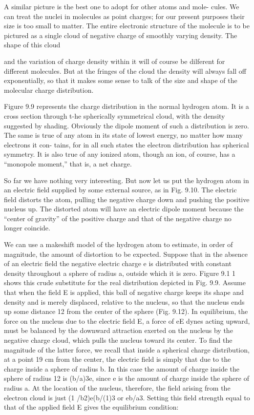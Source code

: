 A similar picture is the best one to adopt for other atoms and mole-
cules. We can treat the nuclei in molecules as point charges; for our
present purposes their size is too small to matter. The entire electronic
structure of the molecule is to be pictured as a single cloud of
negative charge of smoothly varying density. The shape of this cloud

and the variation of charge density within it will of course be dilferent
for different molecules. But at the fringes of the cloud the density
will always fall off exponentially, so that it makes some sense to talk
of the size and shape of the molecular charge distribution.

Figure 9.9 represents the charge distribution in the normal hydrogen
atom. It is a cross section through t-he spherically symmetrical
cloud, with the density suggested by shading. Obviously the dipole
moment of such a distribution is zero. The same is true of any atom
in its state of lowest energy, no matter how many electrons it con-
tains, for in all such states the electron distribution has spherical
symmetry. It is also true of any ionized atom, though an ion, of
course, has a ``monopole moment,'' that is, a net charge.

So far we have nothing very interesting. But now let us put the
hydrogen atom in an electric field supplied by some external source,
as in Fig. 9.10. The electric field distorts the atom, pulling the negative
charge down and pushing the positive nucleus up. The distorted
atom will have an electric dipole moment because the ``center of
gravity'' of the positive charge and that of the negative charge no
longer coincide.

We can use a makeshift model of the hydrogen atom to estimate,
in order of magnitude, the amount of distortion to be expected.
Suppose that in the absence of an electric field the negative electric
charge e is distributed with constant density throughout a sphere of
radius a, outside which it is zero. Figure 9.1 1 shows this crude substitute
for the real distribution depicted in Fig. 9.9. Assume that
when the field E is applied, this ball of negative charge keeps its shape
and density and is merely displaced, relative to the nucleus, so that
the nucleus ends up some distance 12 from the center of the sphere
(Fig. 9.12). In equilibrium, the force on the nucleus due to the electric
field E, a force of eE dynes acting upward, must be balanced by
the downward attraction exerted on the nucleus by the negative
charge cloud, which pulls the nucleus toward its center. To find the
magnitude of the latter force, we recall that inside a spherical charge
distribution, at a point 19 cm from the center, the electric field is
simply that due to the charge inside a sphere of radius b. In this case
the amount of charge inside the sphere of radius 12 is (b/a)3e, since e
is the amount of charge inside the sphere of radius a. At the location
of the nucleus, therefore, the field arising from the electron cloud is
just (1 /b2)e(b/(1)3 or eb/a3. Setting this field strength equal to that
of the applied field E gives the equilibrium condition:

